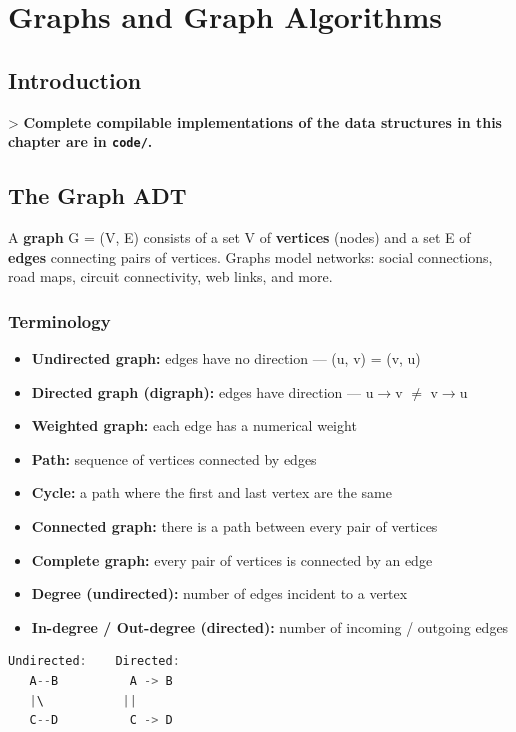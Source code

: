 \chapter{Graphs and Graph Algorithms}\label{ch12:graphs-and-graph-algorithms}

\section{Introduction}

> \textbf{Complete compilable implementations of the data structures in this chapter are in \texttt{code/}.}

\section{The Graph ADT}

A \textbf{graph} G = (V, E) consists of a set V of \textbf{vertices} (nodes) and a set E of \textbf{edges} connecting pairs of vertices. Graphs model networks: social connections, road maps, circuit connectivity, web links, and more.

\subsection{Terminology}

\begin{itemize}
\item \textbf{Undirected graph:} edges have no direction — (u, v) = (v, u)
\item \textbf{Directed graph (digraph):} edges have direction — u$\to $v $\ne $ v$\to $u
\item \textbf{Weighted graph:} each edge has a numerical weight
\item \textbf{Path:} sequence of vertices connected by edges
\item \textbf{Cycle:} a path where the first and last vertex are the same
\item \textbf{Connected graph:} there is a path between every pair of vertices
\item \textbf{Complete graph:} every pair of vertices is connected by an edge
\item \textbf{Degree (undirected):} number of edges incident to a vertex
\item \textbf{In-degree / Out-degree (directed):} number of incoming / outgoing edges
\end{itemize}

\begin{lstlisting}[language=Java]
Undirected:    Directed:
   A--B          A -> B
   |\           ||
   C--D          C -> D
\end{lstlisting}

